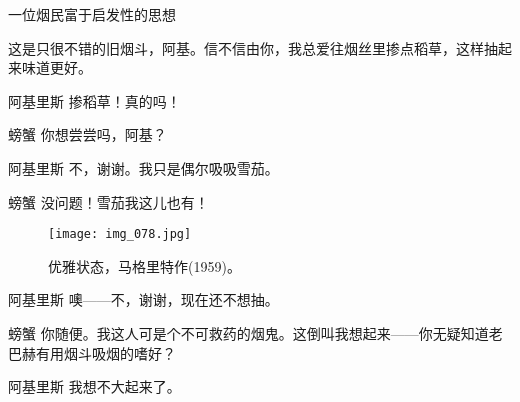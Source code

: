 \begin{dialog}{一位烟民富于启发性的思想}
\begin{dialogue}
这是只很不错的旧烟斗，阿基。信不信由你，我总爱往烟丝里掺点稻草，这样抽起来味道更好。

\item[阿基里斯]掺稻草！真的吗！

\item[螃蟹]你想尝尝吗，阿基？

\item[阿基里斯]不，谢谢。我只是偶尔吸吸雪茄。

\item[螃蟹]没问题！雪茄我这儿也有！

\begin{figure}
\texttt{[image: img\_078.jpg]}
\caption[优雅状态，马格里特作。]
  {优雅状态，马格里特作(1959)。}
\end{figure}

\item[阿基里斯]噢——不，谢谢，现在还不想抽。

\item[螃蟹]你随便。我这人可是个不可救药的烟鬼。这倒叫我想起来——你无疑知道老巴赫有用烟斗吸烟的嗜好？

\item[阿基里斯]我想不大起来了。


\end{dialogue}
\end{dialog}
